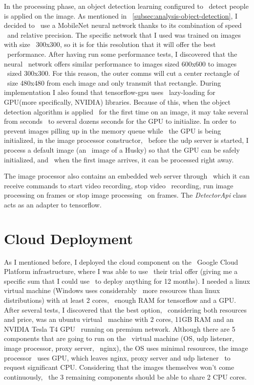 In the processing phase, an object detection learning configured to \
detect people is applied on the image.
As mentioned in ~\ref{subsec:analysis-object-detection}, I decided to \
use a MobileNet neural network thanks to its combination of speed \
and relative precision.
The specific network that I used was trained on images with size \
300x300, so it is for this resolution that it will offer the best \
performance.
After having run some performance tests, I discovered that the neural \
network offers similar performance to images sized 600x600 to images \
sized 300x300.
For this reason, the outer comms will cut a center rectangle of \
size 480x480 from each image and only transmit that rectangle. %
During implementation I also found that tensorflow-gpu uses \
lazy-loading for GPU(more specifically, NVIDIA) libraries.
Because of this, when the object detection algorithm is applied \
for the first time on an image, it may take several from seconds \
to several dozens seconds for the GPU to initialize.
In order to prevent images pilling up in the memory queue while \
the GPU is being initialized, in the image processor constructor, \
before the udp server is started, I process a default image (an \
image of a Husky) so that the GPU can be safely initialized, and \
when the first image arrives, it can be processed right away.

 The image processor also contains an embedded web server through \
which it can receive commands to start video recording, stop video \
recording, run image processing on frames or stop image processing \
on frames.
The \textit{DetectorApi} class acts as an adapter to tensorflow.

\section{Cloud Deployment}
\label{sec:implementation-cloud-deployment}
As I mentioned before, I deployed the cloud component on the \
Google Cloud Platform infrastructure, where I was able to use \
their trial offer (giving me a specific sum that I could use \
to deploy anything for 12 months).
I needed a linux virtual machine (Windows uses considerably \
more resources than linux distributions) with at least 2 cores, \
enough RAM for tensorflow and a GPU.
After several tests, I discovered that the best option, \
considering both resources and price, was an ubuntu virtual \
machine with 2 cores, 11GB RAM and an NVIDIA Tesla T4 GPU \
running on premium network.
Although there are 5 components that are going to run on the \
virtual machine (OS, udp listener, image processor, proxy server, \
nginx), the OS uses minimal resources, the image processor \
uses GPU, which leaves nginx, proxy server and udp listener \
to request significant CPU.
Considering that the images themselves won't come continuously, \
the 3 remaining components should be able to share 2 CPU cores.

